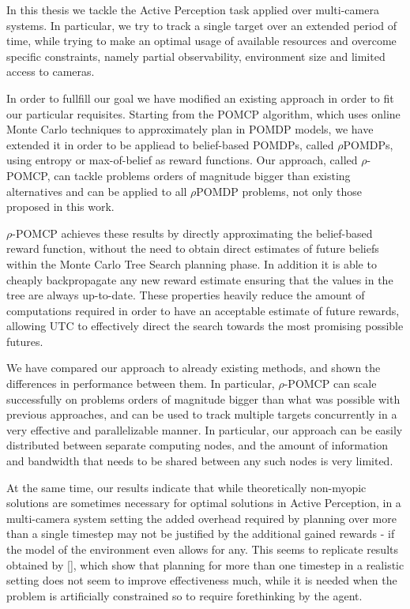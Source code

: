 In this thesis we tackle the Active Perception task applied over multi-camera systems. In
particular, we try to track a single target over an extended period of time, while trying to make an
optimal usage of available resources and overcome specific constraints, namely partial
observability, environment size and limited access to cameras.

In order to fullfill our goal we have modified an existing approach in order to fit our particular
requisites. Starting from the POMCP algorithm, which uses online Monte Carlo techniques to
approximately plan in POMDP models, we have extended it in order to be appliead to belief-based
POMDPs, called $\rho$POMDPs, using entropy or max-of-belief as reward functions. Our approach,
called $\rho$-POMCP, can tackle problems orders of magnitude bigger than existing alternatives and
can be applied to all $\rho$POMDP problems, not only those proposed in this work.

$\rho$-POMCP achieves these results by directly approximating the belief-based reward function,
without the need to obtain direct estimates of future beliefs within the Monte Carlo Tree Search
planning phase. In addition it is able to cheaply backpropagate any new reward estimate ensuring
that the values in the tree are always up-to-date. These properties heavily reduce the amount of
computations required in order to have an acceptable estimate of future rewards, allowing UTC to
effectively direct the search towards the most promising possible futures.

We have compared our approach to already existing methods, and shown the differences in performance
between them. In particular, $\rho$-POMCP can scale successfully on problems orders of magnitude
bigger than what was possible with previous approaches, and can be used to track multiple targets
concurrently in a very effective and parallelizable manner. In particular, our approach can be
easily distributed between separate computing nodes, and the amount of information and bandwidth
that needs to be shared between any such nodes is very limited.

At the same time, our results indicate that while theoretically non-myopic solutions are sometimes
necessary for optimal solutions in Active Perception, in a multi-camera system setting the added
overhead required by planning over more than a single timestep may not be justified by the
additional gained rewards - if the model of the environment even allows for any. This seems to
replicate results obtained by [], which show that planning for more than one timestep in a realistic
setting does not seem to improve effectiveness much, while it is needed when the problem is
artificially constrained so to require forethinking by the agent.

